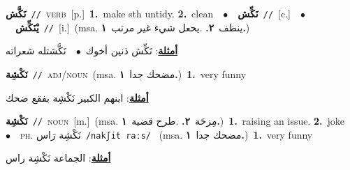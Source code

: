 \documentclass[10pt,a4paper,twoside]{article} %
\begin{document}
\begin{multicols}{2}
{\setlength\topsep{0pt}\textbf{\foreignlanguage{arabic}{نَكَّش}}\ {\color{gray}\texttt{//}\color{black}}\ \textsc{verb}\ [p.]\ \textbf{1.}~make sth untidy.  \textbf{2.}~clean\ \ $\bullet$\ \ \setlength\topsep{0pt}\textbf{\foreignlanguage{arabic}{نَكِّش}}\ {\color{gray}\texttt{//}\color{black}}\ [c.]\ \ $\bullet$\ \ \setlength\topsep{0pt}\textbf{\foreignlanguage{arabic}{يْنَكِّش}}\ {\color{gray}\texttt{//}\color{black}}\ [i.]\ \color{gray}(msa. \foreignlanguage{arabic}{ينظف}~\foreignlanguage{arabic}{\textbf{٢.}}  .\foreignlanguage{arabic}{يحعل شيء غير مرتب}~\foreignlanguage{arabic}{\textbf{١.}})\color{black}\  \begin{flushright}\color{gray}\foreignlanguage{arabic}{\textbf{\underline{\foreignlanguage{arabic}{أمثلة}}}: نَكِّش ذنين أخوك\ $\bullet$\ \  نَكَّشتله شعراته}\end{flushright}\color{black}} \vspace{2mm}

{\setlength\topsep{0pt}\textbf{\foreignlanguage{arabic}{نَكْشِة}}\ {\color{gray}\texttt{//}\color{black}}\ \textsc{adj/noun}\ \color{gray}(msa. \foreignlanguage{arabic}{مضحك جدا}~\foreignlanguage{arabic}{\textbf{١.}})\color{black}\ \textbf{1.}~very funny\  \begin{flushright}\color{gray}\foreignlanguage{arabic}{\textbf{\underline{\foreignlanguage{arabic}{أمثلة}}}: ابنهم الكبير نَكْشِة بفقع ضحك}\end{flushright}\color{black}} \vspace{2mm}

{\setlength\topsep{0pt}\textbf{\foreignlanguage{arabic}{نَكْشِة}}\ {\color{gray}\texttt{//}\color{black}}\ \textsc{noun}\ [m.]\ \color{gray}(msa. \foreignlanguage{arabic}{مِزحَة}~\foreignlanguage{arabic}{\textbf{٢.}}  .\foreignlanguage{arabic}{طرح قضية}~\foreignlanguage{arabic}{\textbf{١.}})\color{black}\ \textbf{1.}~raising an issue.  \textbf{2.}~joke\ \ $\bullet$\ \ \textsc{ph.} \color{gray} \foreignlanguage{arabic}{نَكْشِة رَاس}\color{black}\ {\color{gray}\texttt{/{\sffamily nakʃit raːs}/}\color{black}}\ \color{gray} (msa. \foreignlanguage{arabic}{مضحك جدا}~\foreignlanguage{arabic}{\textbf{١.}})\color{black}\ \textbf{1.}~very funny\  \begin{flushright}\color{gray}\foreignlanguage{arabic}{\textbf{\underline{\foreignlanguage{arabic}{أمثلة}}}: الجماعة نَكْشِة راس}\end{flushright}\color{black}} \vspace{2mm}


\end{multicols}
\end{document}
